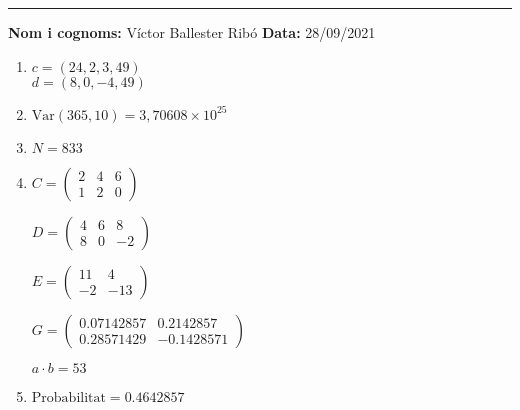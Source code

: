 \documentclass[10pt]{article}
\begin{document}

\vspace{0.5cm}
\rule{\textwidth}{2pt}

\vspace{1.5cm}
{\large\textbf{Nom i cognoms:} Víctor Ballester Ribó}
\hfill
{\large\textbf{Data:} 28/09/2021}

\vspace{2cm}
\begin{enumerate}[leftmargin=*]
      \item $c=(24,2,3,49)$\\
            $d=(8,0,-4,49)$
      \item $\text{Var}(365,10)=3,70608\times10^{25}$
      \item $N=833$
      \item \hfill

            \vspace{1cm}
            $\displaystyle C=
                  \begin{pmatrix}
                        2 & 4 & 6 \\
                        1 & 2 & 0
                  \end{pmatrix}$

            \vspace{1cm}
            $\displaystyle D=
                  \begin{pmatrix}
                        4 & 6 & 8  \\
                        8 & 0 & -2
                  \end{pmatrix}$

            \vspace{1cm}
            $\displaystyle E=
                  \begin{pmatrix}
                        11 & 4   \\
                        -2 & -13
                  \end{pmatrix}$

            \vspace{1cm}
            $\displaystyle G=
                  \begin{pmatrix}
                        0.07142857 & 0.2142857  \\
                        0.28571429 & -0.1428571
                  \end{pmatrix}$

            \vspace{1cm}
            $a\cdot b=53$
      \item $\text{Probabilitat}=0.4642857$
\end{enumerate}
\end{document}
